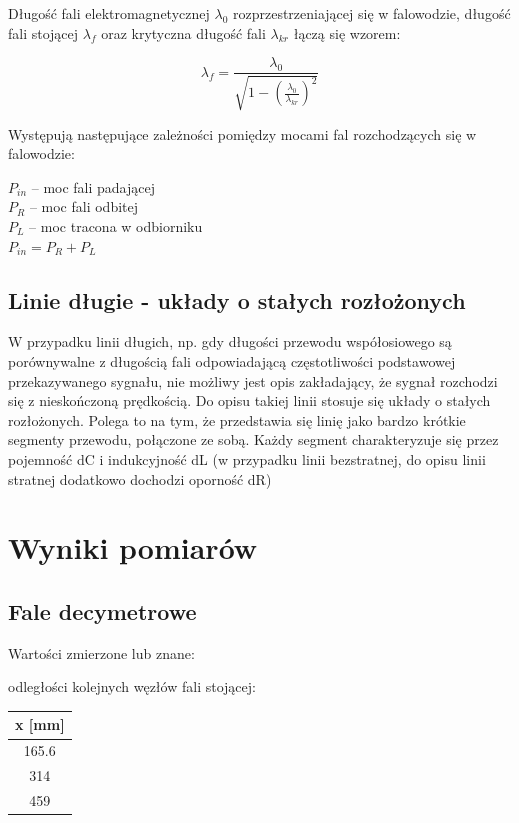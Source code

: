 \documentclass[a4paper,11pt]{article}
\begin{document}
Długość fali elektromagnetycznej \( \lambda _0 \) rozprzestrzeniającej się w falowodzie, długość fali stojącej  \( \lambda _f \) oraz krytyczna długość fali  \( \lambda _{kr} \) łączą się wzorem:

\[ \lambda _f  =  \frac {\lambda _0} { \sqrt {1 - \left( \frac { \lambda _0} { \lambda _{kr} } \right) ^2}   } \]

Występują następujące zależności pomiędzy mocami fal rozchodzących się w falowodzie:

\( P_{in} \) – moc fali padającej \\
\( P_R \) – moc fali odbitej \\
\( P_L \) – moc tracona w odbiorniku \\
\( P_{in}  = P_R + P_L \)

\subsection{Linie długie - układy o stałych rozłożonych}

W przypadku linii długich, np. gdy długości przewodu współosiowego są porównywalne z długością fali odpowiadającą częstotliwości podstawowej przekazywanego sygnału, nie możliwy jest opis zakładający, że sygnał rozchodzi się z nieskończoną prędkością. Do opisu takiej linii stosuje się układy o stałych rozłożonych. Polega to na tym, że przedstawia się linię jako bardzo krótkie segmenty przewodu, połączone ze sobą. Każdy segment charakteryzuje się przez pojemność dC i indukcyjność dL (w przypadku linii bezstratnej, do opisu linii stratnej dodatkowo dochodzi oporność dR)

\section{Wyniki pomiarów}

\subsection{Fale decymetrowe}
Wartości zmierzone lub znane: 

odległości kolejnych węzłów fali stojącej:

\begin{tabular}{|c|}
\hline 
x [mm] \\ 
\hline 
165.6\\
\hline 
314\\
\hline 
459\\
\hline 
\end{tabular} 
\end{document}
